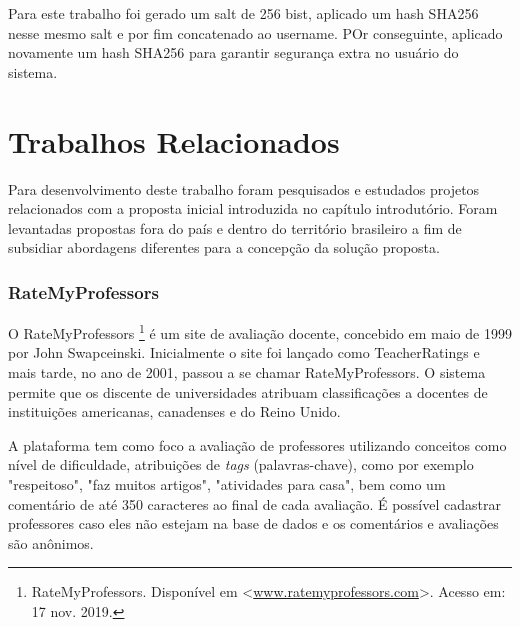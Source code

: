 \documentclass[12pt, a4paper]{report}
\begin{document}
Para este trabalho foi gerado um salt de 256 bist, aplicado um hash SHA256 nesse mesmo salt e por fim concatenado ao username. POr conseguinte,  aplicado novamente um hash SHA256 para garantir segurança extra no usuário do sistema.

\chapter{Trabalhos Relacionados}
\label{chap:trabalhorelacionados}

Para desenvolvimento deste trabalho foram pesquisados e estudados projetos relacionados com a proposta inicial introduzida no capítulo introdutório. Foram levantadas propostas fora do país e dentro do território brasileiro a fim de subsidiar abordagens diferentes para a concepção da solução proposta.
\subsection{RateMyProfessors}
O RateMyProfessors \footnote{RateMyProfessors. Disponível em <\url{www.ratemyprofessors.com}>. Acesso em: 17 nov. 2019.} é um site de avaliação docente, concebido em maio de 1999 por John Swapceinski. Inicialmente o site foi lançado como TeacherRatings e mais tarde, no ano de 2001, passou a se chamar RateMyProfessors. O sistema permite que os discente de universidades atribuam classificações a docentes de instituições americanas, canadenses e do Reino Unido.

A plataforma tem como foco a avaliação de professores utilizando conceitos como nível de dificuldade, atribuições de \textit{tags} (palavras-chave), como por exemplo "respeitoso", "faz muitos artigos", "atividades para casa", bem como um comentário de até 350 caracteres ao final de cada avaliação. É possível cadastrar professores caso eles não estejam na base de dados e os comentários e avaliações são anônimos.
\end{document}

